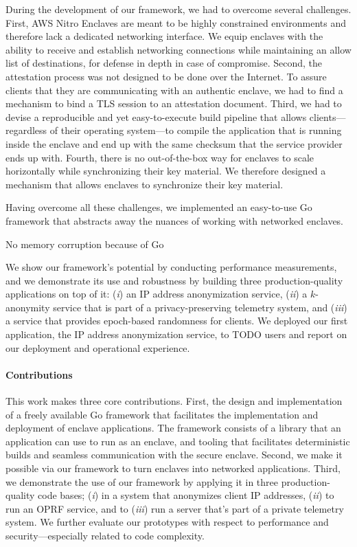 During the development of our framework, we had to overcome several challenges.
First, AWS Nitro Enclaves are meant to be highly constrained environments and
therefore lack a dedicated networking interface.  We equip enclaves with the
ability to receive and establish networking connections while maintaining an
allow list of destinations, for defense in depth in case of compromise.
%
Second, the attestation process was not designed to be done over the Internet.
To assure clients that they are communicating with an authentic enclave, we had
to find a mechanism to bind a TLS session to an attestation document.
%
Third, we had to devise a reproducible and yet easy-to-execute build pipeline
that allows clients---regardless of their operating system---to compile the
application that is running inside the enclave and end up with the same checksum
that the service provider ends up with.
%
Fourth, there is no out-of-the-box way for enclaves to scale horizontally while
synchronizing their key material.  We therefore designed a mechanism that allows
enclaves to synchronize their key material.

Having overcome all these challenges, we implemented an easy-to-use Go framework
that abstracts away the nuances of working with networked enclaves.  

No memory corruption because of Go



We show our
framework's potential by conducting performance measurements, and we demonstrate
its use and robustness by building three production-quality applications on top
of it: (\emph{i}) an IP address anonymization service, (\emph{ii}) a
$k$-anonymity service that is part of a privacy-preserving telemetry system, and
(\emph{iii}) a service that provides epoch-based randomness for clients.  We
deployed our first application, the IP address anonymization service, to TODO
users and report on our deployment and operational experience.

\paragraph{Contributions}

This work makes three core contributions.
%
First, the design and implementation of a freely available Go framework that
facilitates the implementation and deployment of enclave applications.  The
framework consists of a library that an application can use to run as an
enclave, and tooling that facilitates deterministic builds and seamless
communication with the secure enclave.
%
Second, we make it possible via our framework to turn enclaves into networked
applications.
%
Third, we demonstrate the use of our framework by applying it in three
production-quality code bases; (\emph{i}) in a system that anonymizes client IP
addresses, (\emph{ii}) to run an OPRF service, and to (\emph{iii}) run a server
that's part of a private telemetry system.  We further evaluate our prototypes
with respect to performance and security---especially related to code
complexity.

